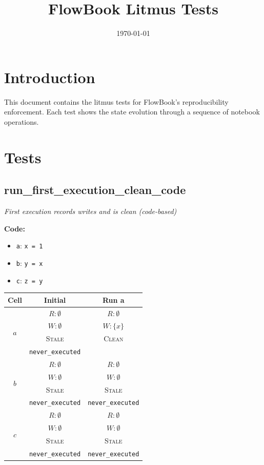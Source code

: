 \documentclass{article}
\title{FlowBook Litmus Tests}
\date{\today}
\begin{document}
\maketitle

\section{Introduction}
This document contains the litmus tests for FlowBook's reproducibility enforcement.
Each test shows the state evolution through a sequence of notebook operations.

\section{Tests}

\subsection{run\_first\_execution\_clean\_code}
\textit{First execution records writes and is clean (code-based)}

\textbf{Code:}
\begin{itemize}
  \item \texttt{a}: \verb|x = 1|
  \item \texttt{b}: \verb|y = x|
  \item \texttt{c}: \verb|z = y|
\end{itemize}

\begin{center}
\small
\begin{tabular}{|c|c|c|}
\hline
\textbf{Cell} & \textbf{Initial} & \textbf{Run a} \\
\hline
\multirow{4}{*}{$a$}
  & $R: \emptyset$ & $R: \emptyset$ \\
  & $W: \emptyset$ & $W: \{x\}$ \\
  & \textsc{Stale} & \textsc{Clean} \\
  & \footnotesize\texttt{never\_executed} &  \\
\hline
\multirow{4}{*}{$b$}
  & $R: \emptyset$ & $R: \emptyset$ \\
  & $W: \emptyset$ & $W: \emptyset$ \\
  & \textsc{Stale} & \textsc{Stale} \\
  & \footnotesize\texttt{never\_executed} & \footnotesize\texttt{never\_executed} \\
\hline
\multirow{4}{*}{$c$}
  & $R: \emptyset$ & $R: \emptyset$ \\
  & $W: \emptyset$ & $W: \emptyset$ \\
  & \textsc{Stale} & \textsc{Stale} \\
  & \footnotesize\texttt{never\_executed} & \footnotesize\texttt{never\_executed} \\
\hline
\end{tabular}
\end{center}
\end{document}
